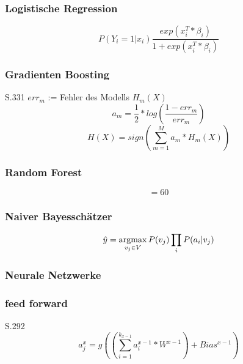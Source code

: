 \subsubsection{Logistische Regression}
\begin{equation} P(Y_{i} = 1 | x_{i}) \frac{exp(x_{i}^{T}*\beta_{i})}{1+exp(x_{i}^{T}*\beta_{i})} \end{equation}

\subsubsection{Gradienten Boosting}
\citep{dummies} S.331
${err}_{m}$ := Fehler des Modells   $H_{m}(X)$
\begin{equation} a_m = \frac{1}{2} * log(\frac{1-{err}_{m}}{{err}_{m}})\end{equation}
\begin{equation} H(X) = sign(\sum_{m=1}^{M} a_{m} * H_{m}(X))\end{equation}
$$ $$

\subsubsection{Random Forest}
$$ = 60$$

\subsubsection{Naiver Bayesschätzer}
\begin{equation} \hat{y} = \operatorname*{argmax}_{v_j \in V} P(v_j) \prod_i P(a_i | v_j) \end{equation}

\subsubsection{Neurale Netzwerke}
\subsubsection{feed forward}
\citep{dummies} S.292
\begin{equation} a_{j}^{x} =  g((\sum_{i=1}^{k_{x-1}} a_{i}^{x-1} * W^{x-1})+Bias^{x-1})\end{equation}

